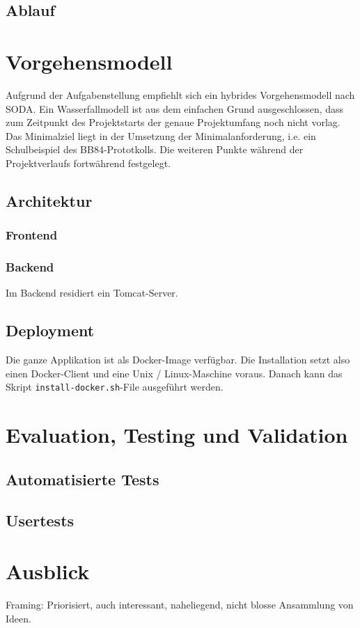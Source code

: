 \documentclass[a4paper,10.2pt,pdftex]{scrartcl}%
\begin{document}
\subsection{Ablauf}
\section{Vorgehensmodell}
Aufgrund der Aufgabenstellung empfiehlt sich ein hybrides Vorgehensmodell nach SODA. Ein Wasserfallmodell ist aus dem einfachen Grund ausgeschlossen, dass zum Zeitpunkt des Projektstarts der genaue Projektumfang noch nicht vorlag. Das Minimalziel liegt in der Umsetzung der Minimalanforderung, i.e. ein Schulbeispiel des BB84-Prototkolls. Die weiteren Punkte während der Projektverlaufs fortwährend festgelegt. 


\subsection{Architektur}
\subsubsection{Frontend}
\subsubsection{Backend}
Im Backend residiert ein Tomcat-Server. 
\subsection{Deployment}
Die ganze Applikation ist als Docker-Image verfügbar. Die Installation setzt also einen Docker-Client und eine Unix / Linux-Maschine voraus. Danach kann das Skript \texttt{install-docker.sh}-File ausgeführt werden. 

\section{Evaluation, Testing und Validation}
\subsection{Automatisierte Tests}
\subsection{Usertests}
\section{Ausblick}
Framing: Priorisiert, auch interessant, naheliegend, nicht blosse Ansammlung von Ideen. 

\newpage
\nocite{*}	

 




\end{document}
